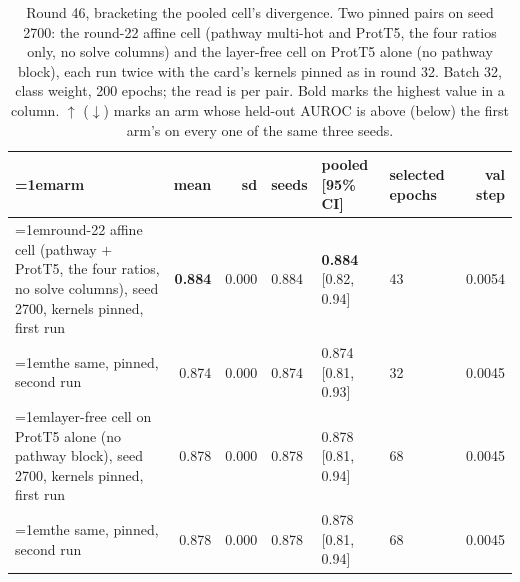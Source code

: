 \begin{table}[H]
  \centering
  \scriptsize
  \setlength{\tabcolsep}{2.5pt}
  \caption[Round 46, bracketing the pooled cell's divergence]{Round 46, bracketing the pooled cell's divergence. Two pinned pairs on seed 2700: the round-22 affine cell (pathway multi-hot and ProtT5, the four ratios only, no solve columns) and the layer-free cell on ProtT5 alone (no pathway block), each run twice with the card's kernels pinned as in round 32. Batch 32, class weight, 200 epochs; the read is per pair. Bold marks the highest value in a column. $\uparrow$ ($\downarrow$) marks an arm whose held-out AUROC is above (below) the first arm's on every one of the same three seeds.}
  \label{tab:w62}
  \begin{tabular}{@{}>{\raggedright\hangindent=1em\hangafter=1\arraybackslash}p{99.6mm}rrlllr@{}}
    \hline
    arm & mean & sd & seeds & pooled [95\% CI] & selected epochs & val step \\
    \hline
    round-22 affine cell (pathway $+$ ProtT5, the four ratios, no solve columns), seed 2700, kernels pinned, first run & \textbf{0.884} & 0.000 & 0.884 & \textbf{0.884} [0.82, 0.94] & 43 & 0.0054 \\
    the same, pinned, second run & 0.874 & 0.000 & 0.874 & 0.874 [0.81, 0.93] & 32 & 0.0045 \\
    layer-free cell on ProtT5 alone (no pathway block), seed 2700, kernels pinned, first run & 0.878 & 0.000 & 0.878 & 0.878 [0.81, 0.94] & 68 & 0.0045 \\
    the same, pinned, second run & 0.878 & 0.000 & 0.878 & 0.878 [0.81, 0.94] & 68 & 0.0045 \\
    \hline
  \end{tabular}
\end{table}
